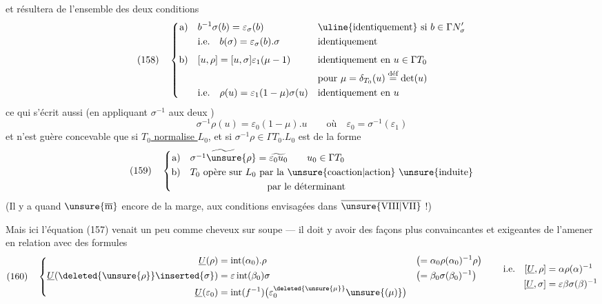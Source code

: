 
et résultera de l'ensemble des deux conditions
\[
(158)\quad
\left\{
\begin{aligned}
\text{a)}\quad&b^{-1}\sigma(b)=\varepsilon_\sigma(b)
&&\text{\uline{identiquement} si }b\in\Gamma N'_\sigma\\
&\text{i.e.}\quad b(\sigma)=\varepsilon_\sigma(b).\sigma
&&\text{identiquement}\\[4pt]
\text{b)}\quad&[u,\rho]=[u,\sigma]\varepsilon_1(\mu-1)
&&\text{identiquement en }u\in\Gamma T_0\\
&&&\text{pour }\mu=\delta_{T_0}(u)\overset{\text{déf}}=\det(u)\\
&\text{i.e.}\quad\rho(u)=\varepsilon_1(1-\mu)\sigma(u)
&&\text{identiquement en }u
\end{aligned}
\right.
\]
ce qui s'écrit aussi (en appliquant $\sigma^{-1}$ aux deux )
\[
\sigma^{-1}\rho(u)=\varepsilon_0(1-\mu).u
\qquad\text{où}\quad\varepsilon_0=\sigma^{-1}(\varepsilon_1)
\]
et n'est guère concevable que si \uline{$T_0$ normalise $L_0$}, et si $\sigma^{-1}\rho\in\Gamma T_0.L_0$  est de la forme
\[
(159)\quad
\left\{
\begin{aligned}
\text{a)}\quad&\widetilde{\sigma^{-1}\unsure{\rho}}=\widetilde{\varepsilon_0u_0}
\qquad u_0\in\Gamma T_0\\
\text{b)}\quad& T_0\text{ opère sur }L_0\text{ par la \unsure{coaction|action} \unsure{induite}}\\
&\hspace{8em}\text{par le déterminant}
\end{aligned}
\right.
\]
(Il y a quand $\unsure{\overline{\mathrm m}}$ encore de la marge,  aux conditions  envisagées dans \uline{$\overline{\unsure{\mathrm{VIII}|\mathrm{VII}}}$} !)

Mais ici l'équation (157) venait un peu comme cheveux sur soupe --- il doit y avoir des façons plus convaincantes et exigeantes de l'amener   en relation avec des formules
\[
(160)\quad
\left\{
\begin{aligned}
\underline U(\rho)&=\operatorname{int}(\alpha_0).\rho
&&\bigl(=\alpha_0\rho(\alpha_0)^{-1}\rho\bigr)\\
\underline U(\deleted{\unsure{\rho}}\inserted{\sigma})&=
\varepsilon\operatorname{int}(\beta_0)\sigma
&&\bigl(=\beta_0\sigma(\beta_0)^{-1}\bigr)\\
\underline U(\varepsilon_0)&=\operatorname{int}(f^{-1})
\bigl(\varepsilon_0^{\deleted{\unsure{\mu}}}\unsure{(\mu)}\bigr)
\end{aligned}
\right.
\qquad
\begin{aligned}
\text{i.e.}\quad[\underline U,\rho]&=\alpha\rho(\alpha)^{-1}\\
[\underline U,\sigma]&=\varepsilon\beta\sigma(\beta)^{-1}
\end{aligned}
\]

